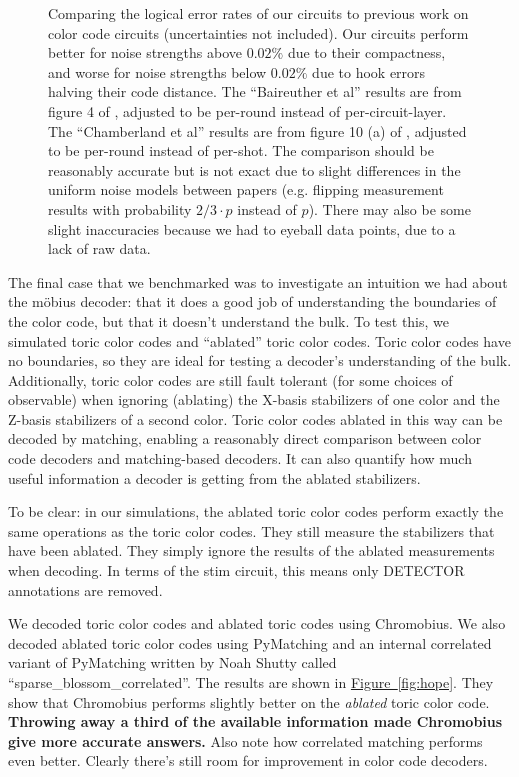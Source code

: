 \documentclass[onecolumn,unpublished,a4paper]{quantumarticle}
\theoremstyle{definition}
\theoremstyle{definition}
\theoremstyle{definition}
\newcommand{\fig}[1]{\hyperref[fig:#1]{Figure~\ref*{fig:#1}}}
\begin{document}
\begin{figure}
{    }
    \caption{
        Comparing the logical error rates of our circuits to previous work on color code circuits (uncertainties not included).
        Our circuits perform better for noise strengths above $0.02\%$ due to their compactness, and worse for noise strengths below $0.02\%$ due to hook errors halving their code distance.
        The ``Baireuther et al'' results are from figure 4 of \cite{baireuther2019nncolorcode}, adjusted to be per-round instead of per-circuit-layer.
        The ``Chamberland et al'' results are from figure 10 (a) of \cite{chamberland2020triangular}, adjusted to be per-round instead of per-shot.
        The comparison should be reasonably accurate but is not exact due to slight differences in the uniform noise models between papers (e.g. flipping measurement results with probability $2/3\cdot p$ instead of $p$).
        There may also be some slight inaccuracies because we had to eyeball data points, due to a lack of raw data.
    }
    \label{fig:compare_previous_work}
\end{figure}

The final case that we benchmarked was to investigate an intuition we had about the m{\"o}bius decoder: that it does a good job of understanding the boundaries of the color code, but that it doesn't understand the bulk.
To test this, we simulated toric color codes and ``ablated'' toric color codes.
Toric color codes have no boundaries, so they are ideal for testing a decoder's understanding of the bulk.
Additionally, toric color codes are still fault tolerant (for some choices of observable) when ignoring (ablating) the X-basis stabilizers of one color and the Z-basis stabilizers of a second color.
Toric color codes ablated in this way can be decoded by matching, enabling a reasonably direct comparison between color code decoders and matching-based decoders.
It can also quantify how much useful information a decoder is getting from the ablated stabilizers.

To be clear: in our simulations, the ablated toric color codes perform exactly the same operations as the toric color codes.
They still measure the stabilizers that have been ablated.
They simply ignore the results of the ablated measurements when decoding.
In terms of the stim circuit, this means only DETECTOR annotations are removed.

We decoded toric color codes and ablated toric codes using Chromobius.
We also decoded ablated toric color codes using PyMatching and an internal correlated variant of PyMatching written by Noah Shutty called ``sparse\_blossom\_correlated''.
The results are shown in \fig{hope}.
They show that Chromobius performs slightly better on the \emph{ablated} toric color code.
\textbf{Throwing away a third of the available information made Chromobius give more accurate answers.}
Also note how correlated matching performs even better.
Clearly there's still room for improvement in color code decoders.
\end{document}
